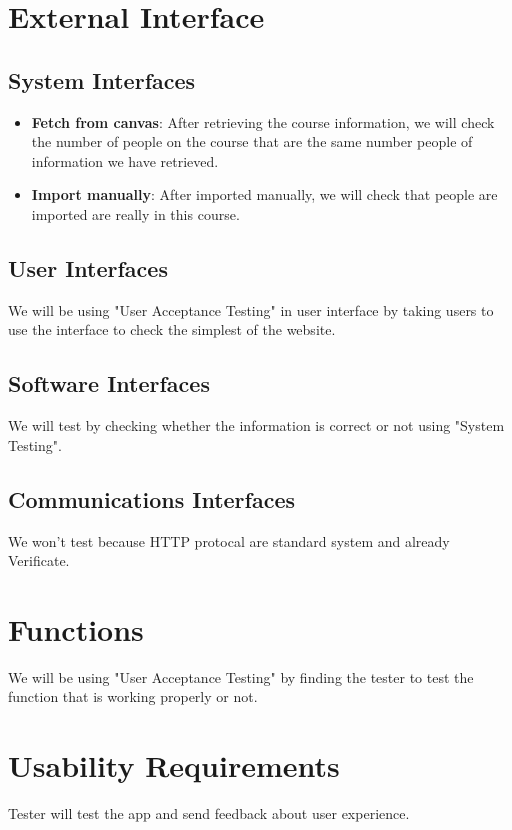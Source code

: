 \documentclass[ 10pt]{report}
\begin{document}
        \section{External Interface}
        \subsection{System Interfaces}
            \begin{itemize}
                \item \textbf{Fetch from canvas}: After retrieving the course information, we will check the number of people on the course that are the same number people of information we have retrieved.
                \item \textbf{Import manually}: After imported manually, we will check that people are imported are really in this course.
            \end{itemize}
        \subsection{User Interfaces}
            We will be using "User Acceptance Testing" in user interface by taking users to use the interface to check the simplest of the website.
        \subsection{Software Interfaces}
            We will test by checking whether the information is correct or not using "System Testing".
        \subsection{Communications Interfaces}
            We won't test because HTTP protocal are standard system and already Verificate.
        \section{Functions}
        We will be using "User Acceptance Testing" by finding the tester to test the function that is working properly or not.
        \section{Usability Requirements}
        Tester will test the app and send feedback about user experience.
\end{document}
